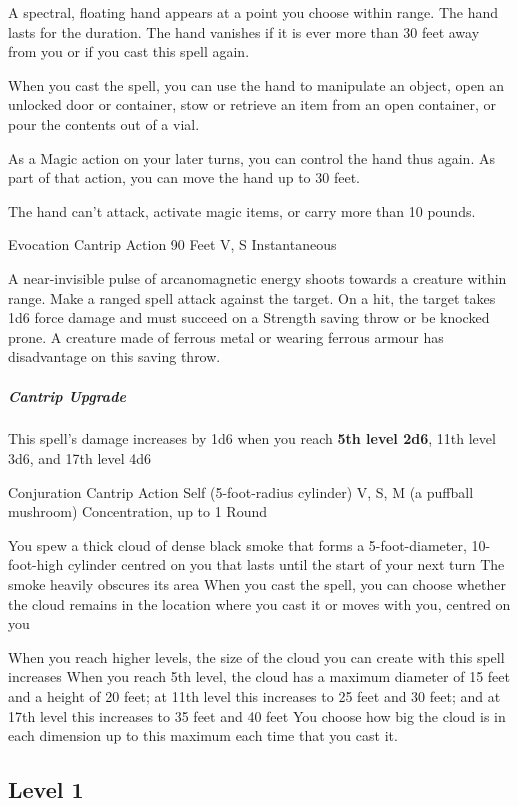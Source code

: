 \documentclass[letterpaper,openany,oneside,twocolumn]{book}
\begin{document}
A spectral, floating hand appears at a point you choose within range. The hand lasts for the duration. The hand vanishes if it is ever more than 30 feet away from you or if you cast this spell again.

When you cast the spell, you can use the hand to manipulate an object, open an unlocked door or container, stow or retrieve an item from an open container, or pour the contents out of a vial.

As a Magic action on your later turns, you can control the hand thus again. As part of that action, you can move the hand up to 30 feet.

The hand can't attack, activate magic items, or carry more than 10 pounds.

	{Evocation Cantrip}
	{Action}
	{90 Feet}
	{V, S}
	{Instantaneous}

A near-invisible pulse of arcanomagnetic energy shoots towards a creature within range. Make a ranged spell attack against the target. On a hit, the target takes 1d6 force damage and must succeed on a Strength saving throw or be knocked prone. A creature made of ferrous metal or wearing ferrous armour has disadvantage on this saving throw.

\subparagraph*{Cantrip Upgrade} This spell's damage increases by 1d6 when you reach \textbf{5th level 2d6}, 11th level 3d6, and 17th level 4d6

	{Conjuration Cantrip}
	{Action}
	{Self (5-foot-radius cylinder)}
	{V, S, M (a puffball mushroom)}
	{Concentration, up to 1 Round}

You spew a thick cloud of dense black smoke that forms a 5-foot-diameter, 10-foot-high cylinder centred on you that lasts until the start of your next turn The smoke heavily obscures its area When you cast the spell, you can choose whether the cloud remains in the location where you cast it or moves with you, centred on you

When you reach higher levels, the size of the cloud you can create with this spell increases When you reach 5th level, the cloud has a maximum diameter of 15 feet and a height of 20 feet; at 11th level this increases to 25 feet and 30 feet; and at 17th level this increases to 35 feet and 40 feet You choose how big the cloud is in each dimension up to this maximum each time that you cast it.

\subsection*{Level 1}
\end{document}

